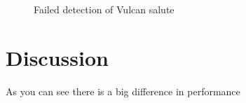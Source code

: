 \begin{figure}[htbp]
\centering
{}
\hspace{0.09\linewidth}
\caption{Failed detection of Vulcan salute}
\label{fig:vulcanfail}
\end{figure}





\section{Discussion}
As you can see there is a big difference in performance



